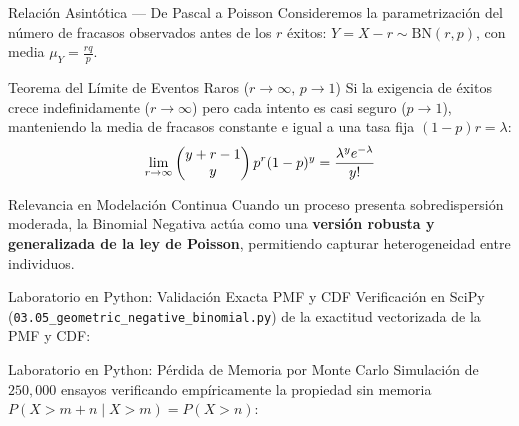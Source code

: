 \documentclass[10pt, aspectratio=169]{beamer}
\begin{document}
\begin{frame}{Relación Asintótica — De Pascal a Poisson}
  \footnotesize
  Consideremos la parametrización del número de fracasos observados antes de los $r$ éxitos: $Y = X - r \sim \text{BN}(r, p)$, con media $\mu_Y = \frac{rq}{p}$. \pause

  \vspace{0.1cm}
  \begin{block}{Teorema del Límite de Eventos Raros ($r \to \infty, \, p \to 1$)}
    Si la exigencia de éxitos crece indefinidamente ($r \to \infty$) pero cada intento es casi seguro ($p \to 1$), manteniendo la media de fracasos constante e igual a una tasa fija $(1-p)r = \lambda$:
    $$\lim_{r \to \infty} \begin{pmatrix} y+r-1 \\ y \end{pmatrix} p^r (1-p)^y = \dfrac{\lambda^y e^{-\lambda}}{y!}$$
  \end{block}

  \vspace{0.1cm}
  \pause
  \begin{alertblock}{Relevancia en Modelación Continua}
    Cuando un proceso presenta sobredispersión moderada, la Binomial Negativa actúa como una \textbf{versión robusta y generalizada de la ley de Poisson}, permitiendo capturar heterogeneidad entre individuos.
  \end{alertblock}
\end{frame}

\begin{frame}[fragile]{Laboratorio en Python: Validación Exacta PMF y CDF}
  \scriptsize
  Verificación en SciPy (\texttt{03.05\_geometric\_negative\_binomial.py}) de la exactitud vectorizada de la PMF y CDF:
  \vspace{0.1cm}
  {
  }
\end{frame}

\begin{frame}[fragile]{Laboratorio en Python: Pérdida de Memoria por Monte Carlo}
  \scriptsize
  Simulación de $250,000$ ensayos verificando empíricamente la propiedad sin memoria $P(X > m+n \mid X > m) = P(X > n)$:
  \vspace{0.08cm}
  {
  }
\end{frame}
\end{document}
